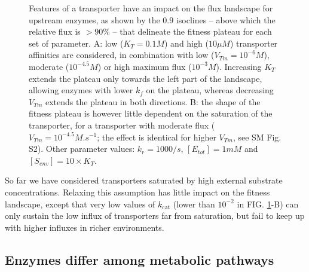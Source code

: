 \documentclass[nogrid,crop,final]{MBE2}%
\newcommand{\othercaption}[1]{\caption{\setlength{\baselineskip}{1.5\baselineskip}#1}}
\begin{document}
\begin{figure}[h!]
\othercaption{Features of a transporter have an impact on the flux landscape for upstream enzymes, as shown by the $0.9$ isoclines -- above which the relative flux is $>90\%$ -- that delineate the fitness plateau for each set of parameter. A: low ($K_T=0.1M$) and high ($10\mu M$) transporter affinities are considered, in combination with low ($V_{Tm}=10^{-6} M$), moderate ($10^{-4.5} M$) or high maximum flux ($10^{-3} M$). Increasing $K_T$ extends the plateau only towards the left part of the landscape, allowing enzymes with lower $k_f$ on the plateau, whereas decreasing $V_{Tm}$ extends the plateau in both directions. B: the shape of the fitness plateau is however little dependent on the saturation of the transporter, for a transporter with moderate flux ($V_{Tm}=10^{-4.5}M.s^{-1}$; the effect is identical for higher $V_{Tm}$, see SM Fig. S2). Other parameter values: $k_r=1000/s$, $[E_{tot}]=1mM$ and $[S_{env}]=10 \times K_T$.}
\label{figure2DSSatStud}
\end{figure}

So far we have considered transporters saturated by high external substrate concentrations. Relaxing this assumption has little impact on the fitness landscape, except that very low values of $k_\text{cat}$ (lower than $10^{-2}$ in FIG. \ref{figure2DSSatStud}-B) can only sustain the low influx of transporters far from saturation, but fail to keep up with higher influxes in richer environments. 

\subsection{Enzymes differ among metabolic pathways}
\end{document}
